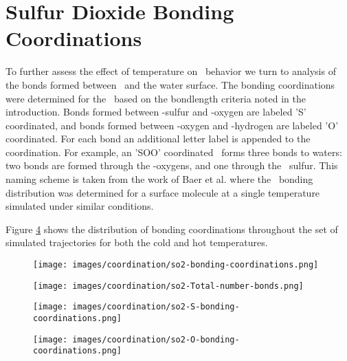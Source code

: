 \section {Sulfur Dioxide Bonding Coordinations}

To further assess the effect of temperature on \suldiox~behavior we turn to analysis of the bonds formed between \suldiox~and the water surface. The bonding coordinations were determined for the \suldiox~based on the bondlength criteria noted in the introduction. Bonds formed between \suldiox-sulfur and \wat-oxygen are labeled 'S' coordinated, and bonds formed between \suldiox-oxygen and \wat-hydrogen are labeled 'O' coordinated. For each bond an additional letter label is appended to the coordination. For example, an 'SOO' coordinated \suldiox~forms three bonds to waters: two bonds are formed through the \suldiox-oxygens, and one through the \suldiox~sulfur. This naming scheme is taken from the work of Baer et al. where the \suldiox~bonding distribution was determined for a surface molecule at a single temperature simulated under similar conditions.\cite{Baer2010}

Figure \ref{fig:so2-bonding-coordinations} shows the distribution of bonding coordinations throughout the set of simulated trajectories for both the cold and hot temperatures.

\begin{figure}[h!]
	\begin{center}
		\texttt{[image: images/coordination/so2-bonding-coordinations.png]}
		\caption{}
		\label{fig:so2-bonding-coordinations}
	\end{center}
\end{figure}


\begin{figure}[h!]
	\begin{center}
		\texttt{[image: images/coordination/so2-Total-number-bonds.png]}
		\caption{}
		\label{fig:so2-bonding-coordinations}
	\end{center}
\end{figure}

\begin{figure}[h!]
	\begin{center}
		\texttt{[image: images/coordination/so2-S-bonding-coordinations.png]}
		\caption{}
		\label{fig:so2-bonding-coordinations}
	\end{center}
\end{figure}

\begin{figure}[h!]
	\begin{center}
		\texttt{[image: images/coordination/so2-O-bonding-coordinations.png]}
		\caption{}
		\label{fig:so2-bonding-coordinations}
	\end{center}
\end{figure}
